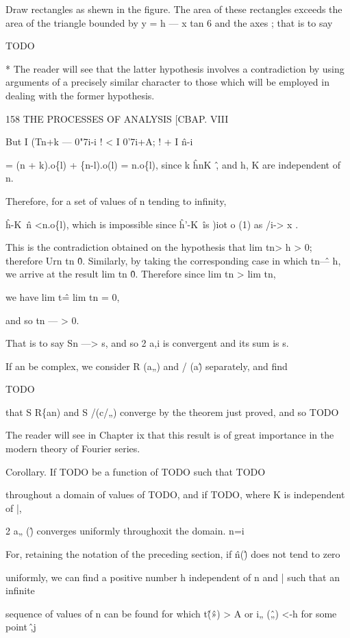 Draw rectangles as shewn in the figure. The area of these rectangles 
exceeds the area of the triangle bounded by y = h — x tan 6 and the axes ; 
that is to say 

TODO

* The reader will see that the latter hypothesis involves a contradiction by using arguments 
of a precisely similar character to those which will be employed in dealing with the former 
hypothesis. 



158 THE PROCESSES OF ANALYSIS [CBAP. VIII 

But I (Tn+k — 0"7i-i ! < I 0'7i+A; ! + I \^n-i \ 

= (n + k).o\{l) + \{n-l).o(l) 
= n.o\{l), 
since k \^ hnK~\^, and h, K are independent of n. 

Therefore, for a set of values of n tending to infinity, 

\^h-K~\^n <n.o\{l), 
which is impossible since \^h'-K~\^ is )iot o (1) as /i-> x . 

This is the contradiction obtained on the hypothesis that lim tn> h > 0; 
therefore Urn tn \^ 0. Similarly, by taking the corresponding case in which 
tn\^ — h, we arrive at the result lim tn \^ 0. Therefore since lim tn > lim tn, 

we have lim t\^ = lim tn = 0, 

and so tn — > 0. 

That is to say Sn —> s, and so 2 a,i is convergent and its sum is s. 

If an be complex, we consider R (a„) and / (a\^) separately, and find 

TODO

that S R\{an) and S /(c/„) converge by the theorem just proved, and so 
TODO

The reader will see in Chapter ix that this result is of great importance 
in the modern theory of Fourier series. 

Corollary. If TODO be a function of TODO such that TODO

throughout a domain of values of TODO, and if TODO, where K is independent of |, 

2 a„ (\^) converges uniformly throughoxit the domain. 
n=i 

For, retaining the notation of the preceding section, if \^n(\^) does not tend to zero 

uniformly, we can find a positive number h independent of n and | such that an infinite 

sequence of values of n can be found for which t\^ (\^») > A or i„ (\^„) <-h for some point \^,j 

